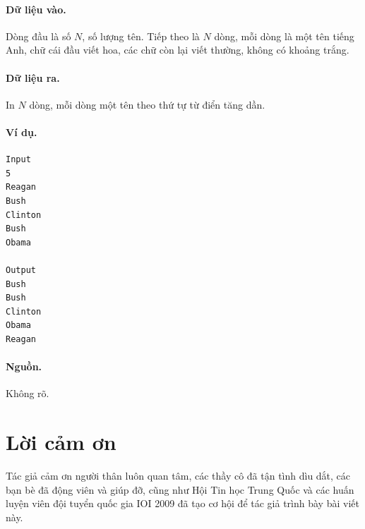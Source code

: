 \documentclass[11pt]{article}
\begin{document}
\paragraph{Dữ liệu vào.}
Dòng đầu là số \(N\), số lượng tên. Tiếp theo là \(N\) dòng, mỗi dòng là một
tên tiếng Anh, chữ cái đầu viết hoa, các chữ còn lại viết thường, không có
khoảng trắng.

\paragraph{Dữ liệu ra.}
In \(N\) dòng, mỗi dòng một tên theo thứ tự từ điển tăng dần.

\paragraph{Ví dụ.}
\begin{verbatim}
Input
5
Reagan
Bush
Clinton
Bush
Obama

Output
Bush
Bush
Clinton
Obama
Reagan
\end{verbatim}

\paragraph{Nguồn.}
Không rõ.

\section*{Lời cảm ơn}

Tác giả cảm ơn người thân luôn quan tâm, các thầy cô đã tận tình dìu dắt, các
bạn bè đã động viên và giúp đỡ, cũng như Hội Tin học Trung Quốc và các huấn
luyện viên đội tuyển quốc gia IOI 2009 đã tạo cơ hội để tác giả trình bày
bài viết này.
\end{document}
